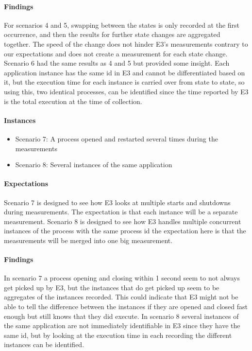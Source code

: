 \paragraph{Findings}
For scenarios 4 and 5, swapping between the states is only recorded at the first occurrence, and then the results for further state changes are aggregated together. The speed of the change does not hinder E3's measurements contrary to our expectations and does not create a measurement for each state change. Scenario 6 had the same results as 4 and 5 but provided some insight. Each application instance has the same id in E3 and cannot be differentiated based on it, but the execution time for each instance is carried over from state to state, so using this, two identical processes, can be identified since the time reported by E3 is the total execution at the time of collection.

\paragraph{Instances}

\begin{itemize}
    \item Scenario 7: A process opened and restarted several times during the measurements
    \item Scenario 8: Several instances of the same application
\end{itemize}

\paragraph{Expectations}
Scenario 7 is designed to see how E3 looks at multiple starts and shutdowns during measurements. The expectation is that each instance will be a separate measurement. Scenario 8 is designed to see how E3 handles multiple concurrent instances of the process with the same process id the expectation here is that the measurements will be merged into one big measurement. 
\paragraph{Findings}
In scenario 7 a process opening and closing within 1 second seem to not always get picked up by E3, but the instances that do get picked up seem to be aggregates of the instances recorded. This could indicate that E3 might not be able to tell the difference between the instances if they are opened and closed fast enough but still knows that they did execute. In scenario 8 several instances of the same application are not immediately identifiable in E3 since they have the same id, but by looking at the execution time in each recording the different instances can be identified.

